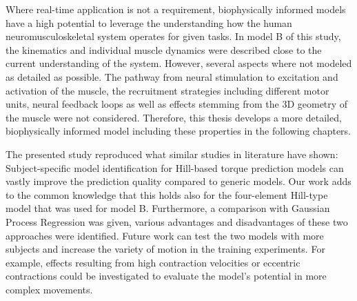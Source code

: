Where real-time application is not a requirement, biophysically informed models have a high potential to leverage the understanding how the human neuromusculoskeletal system operates for given tasks.
In model B of this study, the kinematics and individual muscle dynamics were described close to the current  understanding of the system. However, several aspects where not modeled as detailed as possible. The pathway from neural stimulation to excitation and activation of the muscle, the recruitment strategies including different motor units, neural feedback loops as well as effects stemming from the 3D geometry of the muscle were not considered. Therefore, this thesis develops a more detailed, biophysically informed model including these properties in the following chapters.

The presented study reproduced what similar studies in literature have shown: Subject-specific model identification for Hill-based torque prediction models can vastly improve the prediction quality compared to generic models. Our work adds to the common knowledge that this holds also for the four-element Hill-type model that was used for model B. Furthermore, a comparison with Gaussian Process Regression was given, various advantages and disadvantages of these two approaches were identified. Future work can test the two models with more subjects and increase the variety of motion in the training experiments. For example, effects resulting from high contraction velocities or eccentric contractions could be investigated to evaluate the model's potential in more complex movements.
